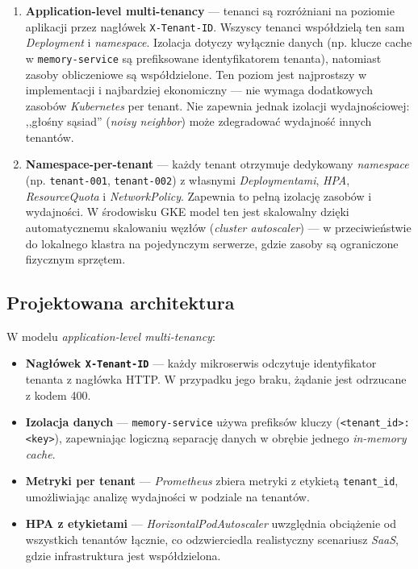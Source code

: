 \begin{enumerate}
  \item \textbf{Application-level multi-tenancy} — tenanci są rozróżniani na poziomie aplikacji przez nagłówek \texttt{X-Tenant-ID}. Wszyscy tenanci współdzielą ten sam \textit{Deployment} i \textit{namespace}. Izolacja dotyczy wyłącznie danych (np. klucze cache w \texttt{memory-service} są prefiksowane identyfikatorem tenanta), natomiast zasoby obliczeniowe są współdzielone. Ten poziom jest najprostszy w implementacji i najbardziej ekonomiczny — nie wymaga dodatkowych zasobów \textit{Kubernetes} per tenant. Nie zapewnia jednak izolacji wydajnościowej: ,,głośny sąsiad'' (\textit{noisy neighbor}) może zdegradować wydajność innych tenantów.

  \item \textbf{Namespace-per-tenant} — każdy tenant otrzymuje dedykowany \textit{namespace} (np. \texttt{tenant-001}, \texttt{tenant-002}) z własnymi \textit{Deploymentami}, \textit{HPA}, \textit{ResourceQuota} i \textit{NetworkPolicy}. Zapewnia to pełną izolację zasobów i wydajności. W środowisku GKE model ten jest skalowalny dzięki automatycznemu skalowaniu węzłów (\textit{cluster autoscaler}) — w przeciwieństwie do lokalnego klastra na pojedynczym serwerze, gdzie zasoby są ograniczone fizycznym sprzętem.
\end{enumerate}

\subsection{Projektowana architektura}

W modelu \textit{application-level multi-tenancy}:

\begin{itemize}
  \item \textbf{Nagłówek \texttt{X-Tenant-ID}} — każdy mikroserwis odczytuje identyfikator tenanta z nagłówka HTTP. W przypadku jego braku, żądanie jest odrzucane z kodem 400.
  \item \textbf{Izolacja danych} — \texttt{memory-service} używa prefiksów kluczy (\texttt{<tenant\_id>:<key>}), zapewniając logiczną separację danych w obrębie jednego \textit{in-memory cache}.
  \item \textbf{Metryki per tenant} — \textit{Prometheus} zbiera metryki z etykietą \texttt{tenant\_id}, umożliwiając analizę wydajności w podziale na tenantów.
  \item \textbf{HPA z etykietami} — \textit{HorizontalPodAutoscaler} uwzględnia obciążenie od wszystkich tenantów łącznie, co odzwierciedla realistyczny scenariusz \textit{SaaS}, gdzie infrastruktura jest współdzielona.
\end{itemize}

